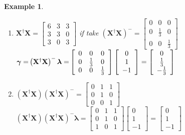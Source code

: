 \documentclass{article}
\newtheorem{example}[theorem]{Example}
\begin{document}
\begin{example}
\begin{enumerate}
\item $\mathbf{X}^{\dagger }\mathbf{X=}\left[ 
\begin{array}{ccc}
6 & 3 & 3 \\ 
3 & 3 & 0 \\ 
3 & 0 & 3%
\end{array}%
\right] $\newline
\newline
if take $\left( \mathbf{X}^{\dagger }\mathbf{X}\right) ^{-}=\left[ 
\begin{array}{ccc}
0 & 0 & 0 \\ 
0 & \frac{1}{3} & 0 \\ 
0 & 0 & \frac{1}{3}%
\end{array}%
\right] $\newline
\newline
$\mathbf{\gamma =}\left( \mathbf{X}^{\dagger }\mathbf{X}\right) ^{-}\mathbf{%
\lambda =}\left[ 
\begin{array}{ccc}
0 & 0 & 0 \\ 
0 & \frac{1}{3} & 0 \\ 
0 & 0 & \frac{1}{3}%
\end{array}%
\right] \left[ 
\begin{array}{c}
0 \\ 
1 \\ 
-1%
\end{array}%
\right] =\left[ 
\begin{array}{c}
0 \\ 
\frac{1}{3} \\ 
-\frac{1}{3}%
\end{array}%
\right] $\newline
\newline

\item $\left( \mathbf{X}^{\dagger }\mathbf{X}\right) \left( \mathbf{X}%
^{\dagger }\mathbf{X}\right) ^{-}=\left[ 
\begin{array}{ccc}
0 & 1 & 1 \\ 
0 & 1 & 0 \\ 
0 & 0 & 1%
\end{array}%
\right] $\newline
\newline
$\left( \mathbf{X}^{\dagger }\mathbf{X}\right) \left( \mathbf{X}^{\dagger }%
\mathbf{X}\right) ^{-}\mathbf{\lambda =}\left[ 
\begin{array}{ccc}
0 & 1 & 1 \\ 
0 & 1 & 0 \\ 
1 & 0 & 1%
\end{array}%
\right] \left[ 
\begin{array}{c}
0 \\ 
1 \\ 
-1%
\end{array}%
\right] =\left[ 
\begin{array}{c}
0 \\ 
1 \\ 
-1%
\end{array}%
\right] $
\end{enumerate}
\end{example}
\end{document}
